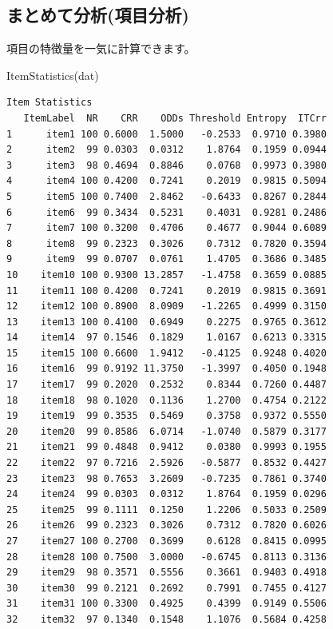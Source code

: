 \documentclass[
  a4paper,
]{ltjsbook}
\newenvironment{Shaded}{\begin{snugshade}}{\end{snugshade}}
\newcommand{\FunctionTok}[1]{\textcolor[rgb]{0.28,0.35,0.67}{#1}}
\newcommand{\NormalTok}[1]{\textcolor[rgb]{0.00,0.23,0.31}{#1}}
\begin{document}
\subsection{まとめて分析(項目分析)}\label{ux307eux3068ux3081ux3066ux5206ux6790ux9805ux76eeux5206ux6790}

項目の特徴量を一気に計算できます。

\begin{Shaded}
\begin{Highlighting}[]
\FunctionTok{ItemStatistics}\NormalTok{(dat)}
\end{Highlighting}
\end{Shaded}

\begin{verbatim}
Item Statistics
   ItemLabel  NR    CRR    ODDs Threshold Entropy  ITCrr
1      item1 100 0.6000  1.5000   -0.2533  0.9710 0.3980
2      item2  99 0.0303  0.0312    1.8764  0.1959 0.0944
3      item3  98 0.4694  0.8846    0.0768  0.9973 0.3980
4      item4 100 0.4200  0.7241    0.2019  0.9815 0.5094
5      item5 100 0.7400  2.8462   -0.6433  0.8267 0.2844
6      item6  99 0.3434  0.5231    0.4031  0.9281 0.2486
7      item7 100 0.3200  0.4706    0.4677  0.9044 0.6089
8      item8  99 0.2323  0.3026    0.7312  0.7820 0.3594
9      item9  99 0.0707  0.0761    1.4705  0.3686 0.3485
10    item10 100 0.9300 13.2857   -1.4758  0.3659 0.0885
11    item11 100 0.4200  0.7241    0.2019  0.9815 0.3691
12    item12 100 0.8900  8.0909   -1.2265  0.4999 0.3150
13    item13 100 0.4100  0.6949    0.2275  0.9765 0.3612
14    item14  97 0.1546  0.1829    1.0167  0.6213 0.3315
15    item15 100 0.6600  1.9412   -0.4125  0.9248 0.4020
16    item16  99 0.9192 11.3750   -1.3997  0.4050 0.1948
17    item17  99 0.2020  0.2532    0.8344  0.7260 0.4487
18    item18  98 0.1020  0.1136    1.2700  0.4754 0.2122
19    item19  99 0.3535  0.5469    0.3758  0.9372 0.5550
20    item20  99 0.8586  6.0714   -1.0740  0.5879 0.3177
21    item21  99 0.4848  0.9412    0.0380  0.9993 0.1955
22    item22  97 0.7216  2.5926   -0.5877  0.8532 0.4427
23    item23  98 0.7653  3.2609   -0.7235  0.7861 0.3740
24    item24  99 0.0303  0.0312    1.8764  0.1959 0.0296
25    item25  99 0.1111  0.1250    1.2206  0.5033 0.2509
26    item26  99 0.2323  0.3026    0.7312  0.7820 0.6026
27    item27 100 0.2700  0.3699    0.6128  0.8415 0.0995
28    item28 100 0.7500  3.0000   -0.6745  0.8113 0.3136
29    item29  98 0.3571  0.5556    0.3661  0.9403 0.4918
30    item30  99 0.2121  0.2692    0.7991  0.7455 0.4127
31    item31 100 0.3300  0.4925    0.4399  0.9149 0.5506
32    item32  97 0.1340  0.1548    1.1076  0.5684 0.4258

\end{verbatim}
\end{document}

